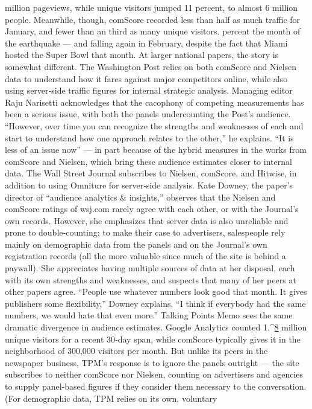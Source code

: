 million pageviews, while unique visitors jumped 11 percent, to almost 6
million people. Meanwhile, though, comScore recorded less than half as
much traffic for January, and fewer than an third as many unique visitors.
percent the month of the earthquake — and falling again in February,
despite the fact that Miami hosted the Super Bowl that month.
At larger national papers, the story is somewhat different. The Washington
Post relies on both comScore and Nielsen data to understand how it fares
against major competitors online, while also using server‐side traffic
figures for internal strategic analysis. Managing editor Raju Narisetti
acknowledges that the cacophony of competing measurements has been a
serious issue, with both the panels undercounting the Post’s audience.
``However, over time you can recognize the strengths and weaknesses of
each and start to understand how one approach relates to the other,'' he
explains. ``It is less of an issue now'' — in part because of the hybrid
measures in the works from comScore and Nielsen, which bring these
audience estimates closer to internal data.
The Wall Street Journal subscribes to Nielsen, comScore, and Hitwise, in
addition to using Omniture for server‐side analysis. Kate Downey, the
paper’s director of ``audience analytics & insights,'' observes that the
Nielsen and comScore ratings of wsj.com rarely agree with each other, or
with the Journal’s own records. However, she emphasizes that server data
is also unreliable and prone to double‐counting; to make their case to
advertisers, salespeople rely mainly on demographic data from the panels
and on the Journal’s own registration records (all the more valuable since
much of the site is behind a paywall). She appreciates having multiple
sources of data at her disposal, each with its own strengths and
weaknesses, and suspects that many of her peers at other papers agree.
``People use whatever numbers look good that month. It gives publishers
some flexibility,'' Downey explains. ``I think if everybody had the same
numbers, we would hate that even more.''
Talking Points Memo sees the same dramatic divergence in audience
estimates. Google Analytics counted 1.^{\href{#endnotes}{8}} million unique visitors for a
recent 30‐day span, while comScore typically gives it in the neighborhood
of 300,000 visitors per month. But unlike its peers in the newspaper
business, TPM’s response is to ignore the panels outright — the site
subscribes to neither comScore nor Nielsen, counting on advertisers and
agencies to supply panel‐based figures if they consider them necessary to
the conversation. (For demographic data, TPM relies on its own, voluntary
